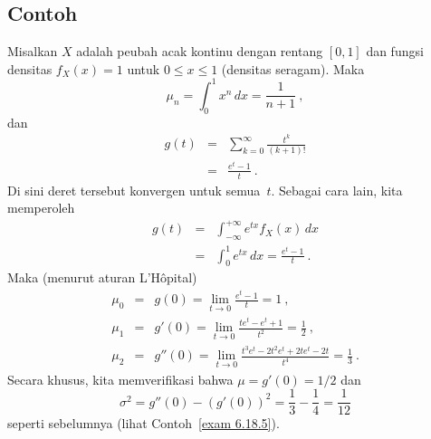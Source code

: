 \subsection*{Contoh}
\begin{example}\label{exam 10.3.1}
Misalkan $X$ adalah peubah acak kontinu dengan rentang $[0,1]$ dan fungsi
densitas $f_X(x) = 1$ untuk $0 \leq x \leq 1$ (densitas seragam).  Maka
$$
\mu_n = \int_0^1 x^n\, dx = \frac1{n + 1}\ ,
$$
dan
\begin{eqnarray*}
g(t) &=& \sum_{k = 0}^\infty \frac{t^k}{(k+1)!}\\
     &=& \frac{e^t - 1}t\ .
\end{eqnarray*}
Di sini deret tersebut konvergen untuk semua~$t$.  Sebagai cara lain, kita memperoleh
\begin{eqnarray*}
g(t) &=& \int_{-\infty}^{+\infty} e^{tx} f_X(x)\, dx \\
     &=& \int_0^1 e^{tx}\, dx = \frac{e^t - 1}t\ .
\end{eqnarray*}
Maka (menurut aturan L'H\^opital)
\begin{eqnarray*}
\mu_0 &=& g(0) = \lim_{t \to 0} \frac{e^t - 1}t = 1\ , \\
\mu_1 &=& g'(0) = \lim_{t \to 0} \frac{te^t - e^t + 1}{t^2} = \frac12\ , \\
\mu_2 &=& g''(0) = \lim_{t \to 0} \frac{t^3e^t - 2t^2e^t + 2te^t - 2t}{t^4} =
\frac13\ .
\end{eqnarray*}
Secara khusus, kita memverifikasi bahwa $\mu = g'(0) = 1/2$ dan
$$
\sigma^2 = g''(0) - (g'(0))^2 = \frac13 - \frac14 = \frac1{12}
$$
seperti sebelumnya (lihat Contoh~\ref{exam 6.18.5}).
\end{example}

